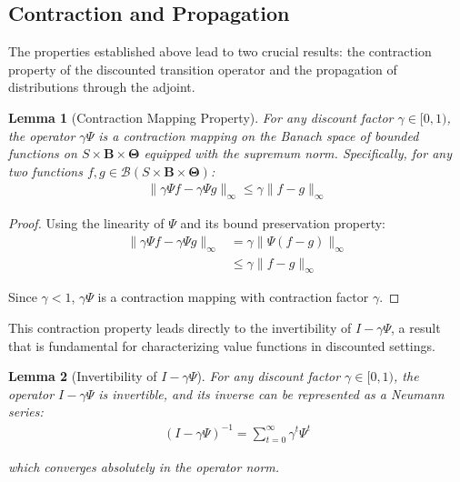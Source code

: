 \documentclass[a4paper,12pt]{report}
\newtheorem{lemma}{Lemma}
\begin{document}
\subsection{Contraction and Propagation}

The properties established above lead to two crucial results: the contraction
property of the discounted transition operator and the propagation of
distributions through the adjoint.

\begin{lemma}[Contraction Mapping Property]
    For any discount factor $\gamma \in [0,1)$, the operator $\gamma \Psi$ is a
    contraction mapping on the Banach space of bounded functions on
    $S \times \boldsymbol{B}\times \boldsymbol{\Theta}$ equipped with the supremum
    norm. Specifically, for any two functions
    $f, g \in \mathcal{B}(S \times \boldsymbol{B}\times \boldsymbol{\Theta})$:
    \begin{align}
        \|\gamma \Psi f - \gamma \Psi g\|_{\infty}\leq \gamma\|f - g\|_{\infty}
    \end{align}
\end{lemma}

\begin{proof}
    Using the linearity of $\Psi$ and its bound preservation property:
    \begin{align}
        \|\gamma \Psi f - \gamma \Psi g\|_{\infty} & = \gamma\|\Psi(f - g)\|_{\infty} \\
                                                   & \leq \gamma\|f - g\|_{\infty}
    \end{align}

    Since $\gamma < 1$, $\gamma \Psi$ is a contraction mapping with contraction
    factor $\gamma$.
\end{proof}

This contraction property leads directly to the invertibility of
$I - \gamma\Psi$, a result that is fundamental for characterizing value functions
in discounted settings.

\begin{lemma}[Invertibility of $I - \gamma \Psi$]
    For any discount factor $\gamma \in [0,1)$, the operator $I - \gamma \Psi$ is
    invertible, and its inverse can be represented as a Neumann series:
    \begin{align}
        (I - \gamma \Psi)^{-1}= \sum_{t=0}^{\infty}\gamma^{t} \Psi^{t}
    \end{align}

    which converges absolutely in the operator norm.
\end{lemma}
\end{document}
